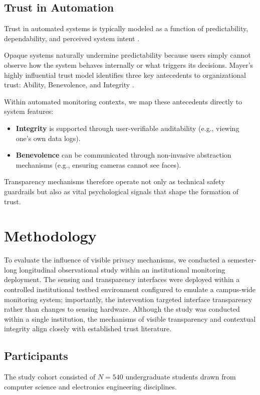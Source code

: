 \documentclass[conference]{IEEEtran}
\begin{document}
\subsection{Trust in Automation}
Trust in automated systems is typically modeled as a function of predictability, dependability, and perceived system intent \cite{b5}. 

Opaque systems naturally undermine predictability because users simply cannot observe how the system behaves internally or what triggers its decisions. Mayer's highly influential trust model identifies three key antecedents to organizational trust: Ability, Benevolence, and Integrity \cite{b6}. 

Within automated monitoring contexts, we map these antecedents directly to system features:
\begin{itemize}
    \item \textbf{Integrity} is supported through user-verifiable auditability (e.g., viewing one's own data logs).
    \item \textbf{Benevolence} can be communicated through non-invasive abstraction mechanisms (e.g., ensuring cameras cannot see faces).
\end{itemize}
Transparency mechanisms therefore operate not only as technical safety guardrails but also as vital psychological signals that shape the formation of trust.

\section{Methodology}

To evaluate the influence of visible privacy mechanisms, we conducted a semester-long longitudinal observational study within an institutional monitoring deployment. The sensing and transparency interfaces were deployed within a controlled institutional testbed environment configured to emulate a campus-wide monitoring system; importantly, the intervention targeted interface transparency rather than changes to sensing hardware. Although the study was conducted within a single institution, the mechanisms of visible transparency and contextual integrity align closely with established trust literature.

\subsection{Participants}
The study cohort consisted of $N=540$ undergraduate students drawn from computer science and electronics engineering disciplines. 
\end{document}
